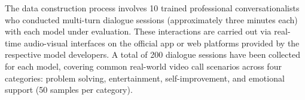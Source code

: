 \documentclass{article}
\begin{document}
\begin{table}[htbp]
    \caption{Percentage of good cases in qualitative analysis.}
    \centering
    \label{tab:percentage_of_qualitative}
\end{table}

The data construction process involves 10 trained professional conversationalists who conducted multi-turn dialogue sessions (approximately three minutes each) with each model under evaluation. These interactions are carried out via real-time audio-visual interfaces on the official app or web platforms provided by the respective model developers.
A total of 200 dialogue sessions have been collected for each model, covering common real-world video call scenarios across four categories: problem solving, entertainment, self-improvement, and emotional support (50 samples per category).
\end{document}
